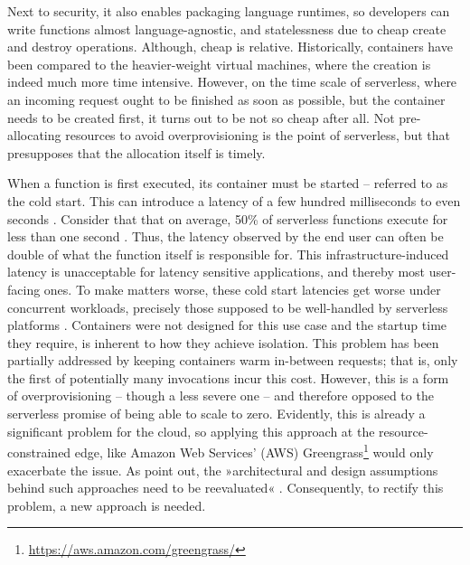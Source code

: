 Next to security, it also enables packaging language runtimes, so developers can write functions almost language-agnostic, and statelessness due to cheap create and destroy operations. Although, cheap is relative. Historically, containers have been compared to the heavier-weight virtual machines, where the creation is indeed much more time intensive. However, on the time scale of serverless, where an incoming request ought to be finished as soon as possible, but the container needs to be created first, it turns out to be not so cheap after all. Not pre-allocating resources to avoid overprovisioning is the point of serverless, but that presupposes that the allocation itself is timely.

When a function is first executed, its container must be started -- referred to as the cold start. This can introduce a latency of a few hundred milliseconds to even seconds \cite{Manner2018, Wang2018}. Consider that that on average, 50\% of serverless functions execute for less than one second \cite{Shahrad2020}. Thus, the latency observed by the end user can often be double of what the function itself is responsible for. This infrastructure-induced latency is unacceptable for latency sensitive applications, and thereby most user-facing ones.
To make matters worse, these cold start latencies get worse under concurrent workloads, precisely those supposed to be well-handled by serverless platforms \cite{Mohan2019}. Containers were not designed for this use case and the startup time they require, is inherent to how they achieve isolation.
This problem has been partially addressed by keeping containers warm in-between requests; that is, only the first of potentially many invocations incur this cost. However, this is a form of overprovisioning -- though a less severe one -- and therefore opposed to the serverless promise of being able to scale to zero.
Evidently, this is already a significant problem for the cloud, so applying this approach at the resource-constrained edge, like Amazon Web Services' (AWS) Greengrass\footnote{\url{https://aws.amazon.com/greengrass/}} would only exacerbate the issue.
As \citeauthor{Nastic2018} point out, the »architectural and design assumptions behind such approaches need to be reevaluated« \cite{Nastic2018}. Consequently, to rectify this problem, a new approach is needed.


